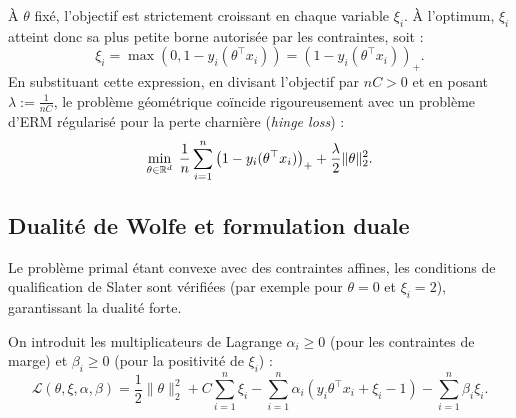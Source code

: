 \begin{proposition}
    À $\theta$ fixé, l'objectif est strictement croissant en chaque variable $\xi_i$. À l'optimum, $\xi_i$ atteint donc sa plus petite borne autorisée par les contraintes, soit :
    \begin{equation}
        \xi_i = \max(0, 1 - y_i(\theta^\top x_i)) = \left(1 - y_i(\theta^\top x_i)\right)_+.
    \end{equation}
    En substituant cette expression, en divisant l'objectif par $nC > 0$ et en posant $\lambda := \frac{1}{nC}$, le problème géométrique coïncide rigoureusement avec un problème d'ERM régularisé pour la perte charnière (\emph{hinge loss}) :
    \begin{equation}
        \min_{\theta \in \mathbb{R}^d} \; \frac{1}{n} \sum_{i=1}^n \left(1 - y_i(\theta^\top x_i)\right)_+ + \frac{\lambda}{2}\|\theta\|_2^2.
    \end{equation}    
\end{proposition}


\subsection{Dualité de Wolfe et formulation duale}

Le problème primal étant convexe avec des contraintes affines, les conditions de qualification de Slater sont vérifiées (par exemple pour $\theta = 0$ et $\xi_i = 2$), garantissant la dualité forte.

On introduit les multiplicateurs de Lagrange $\alpha_i \geqslant 0$ (pour les contraintes de marge) et $\beta_i \geqslant 0$ (pour la positivité de $\xi_i$) :
\begin{equation}
    \mathcal{L}(\theta, \xi, \alpha, \beta) = \frac{1}{2}\|\theta\|_2^2 + C \sum_{i=1}^n \xi_i - \sum_{i=1}^n \alpha_i \left(y_i \theta^\top x_i + \xi_i - 1\right) - \sum_{i=1}^n \beta_i \xi_i.
\end{equation}

